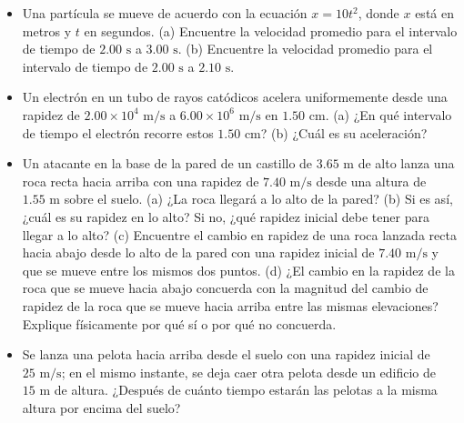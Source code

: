 \documentclass[11pt,a4paper]{article}
\begin{document}
\begin{itemize}
    \item[\textbf{9.}] Una partícula se mueve de acuerdo con la ecuación $x = 10t^2$, donde $x$ está en metros y $t$ en segundos. (a) Encuentre la velocidad promedio para el intervalo de tiempo de $2.00 \text{ s}$ a $3.00 \text{ s}$. (b) Encuentre la velocidad promedio para el intervalo de tiempo de $2.00 \text{ s}$ a $2.10 \text{ s}$.
    \vspace*{6cm}

    \item[\textbf{10.}] Un electrón en un tubo de rayos catódicos acelera uniformemente desde una rapidez de $2.00 \times 10^4 \text{ m/s}$ a $6.00 \times 10^6 \text{ m/s}$ en $1.50 \text{ cm}$. (a) ¿En qué intervalo de tiempo el electrón recorre estos $1.50 \text{ cm}$? (b) ¿Cuál es su aceleración?
    \vspace*{6cm}

    \item[\textbf{11.}] Un atacante en la base de la pared de un castillo de $3.65 \text{ m}$ de alto lanza una roca recta hacia arriba con una rapidez de $7.40 \text{ m/s}$ desde una altura de $1.55 \text{ m}$ sobre el suelo. (a) ¿La roca llegará a lo alto de la pared? (b) Si es así, ¿cuál es su rapidez en lo alto? Si no, ¿qué rapidez inicial debe tener para llegar a lo alto? (c) Encuentre el cambio en rapidez de una roca lanzada recta hacia abajo desde lo alto de la pared con una rapidez inicial de $7.40 \text{ m/s}$ y que se mueve entre los mismos dos puntos. (d) ¿El cambio en la rapidez de la roca que se mueve hacia abajo concuerda con la magnitud del cambio de rapidez de la roca que se mueve hacia arriba entre las mismas elevaciones? Explique físicamente por qué sí o por qué no concuerda.
    \vspace*{8cm}

    \item[\textbf{12.}] Se lanza una pelota hacia arriba desde el suelo con una rapidez inicial de $25 \text{ m/s}$; en el mismo instante, se deja caer otra pelota desde un edificio de $15 \text{ m}$ de altura. ¿Después de cuánto tiempo estarán las pelotas a la misma altura por encima del suelo?
    \vspace*{6cm}
\end{itemize}

\newpage
\end{document}
